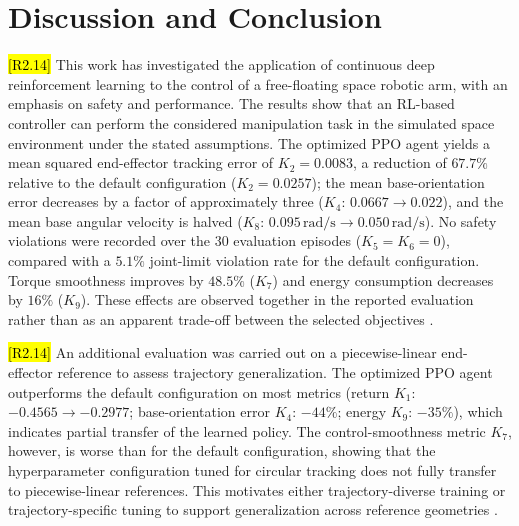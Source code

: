 \documentclass{ieeeaccess}
\newcommand{\hltwo}[1]{{\sethlcolor{rtwo}\hl{#1}}}
\newenvironment{rtwohl}
  {\def\FrameCommand{\colorbox{rtwo}}\MakeFramed{\advance\hsize-\width\FrameRestore}}
  {\endMakeFramed}
\begin{document}
\section{Discussion and Conclusion}
\begin{rtwohl}
\hltwo{[R2.14]} This work has investigated the application of continuous deep reinforcement learning to the control of a free-floating space robotic arm, with an emphasis on safety and performance. The results show that an RL-based controller can perform the considered manipulation task in the simulated space environment under the stated assumptions. The optimized PPO agent yields a mean squared end-effector tracking error of $K_2 = 0.0083$, a reduction of $67.7\%$ relative to the default configuration ($K_2 = 0.0257$); the mean base-orientation error decreases by a factor of approximately three ($K_4$: $0.0667 \to 0.022$), and the mean base angular velocity is halved ($K_8$: $0.095\,\mathrm{rad/s} \to 0.050\,\mathrm{rad/s}$). No safety violations were recorded over the 30 evaluation episodes ($K_5 = K_6 = 0$), compared with a $5.1\%$ joint-limit violation rate for the default configuration. Torque smoothness improves by $48.5\%$ ($K_7$) and energy consumption decreases by $16\%$ ($K_9$). These effects are observed together in the reported evaluation rather than as an apparent trade-off between the selected objectives \cite{b1,b7}.
\end{rtwohl}

\begin{rtwohl}
\hltwo{[R2.14]} An additional evaluation was carried out on a piecewise-linear end-effector reference to assess trajectory generalization. The optimized PPO agent outperforms the default configuration on most metrics (return $K_1$: $-0.4565 \to -0.2977$; base-orientation error $K_4$: $-44\%$; energy $K_9$: $-35\%$), which indicates partial transfer of the learned policy. The control-smoothness metric $K_7$, however, is worse than for the default configuration, showing that the hyperparameter configuration tuned for circular tracking does not fully transfer to piecewise-linear references. This motivates either trajectory-diverse training or trajectory-specific tuning to support generalization across reference geometries \cite{b8}.
\end{rtwohl}
\end{document}
